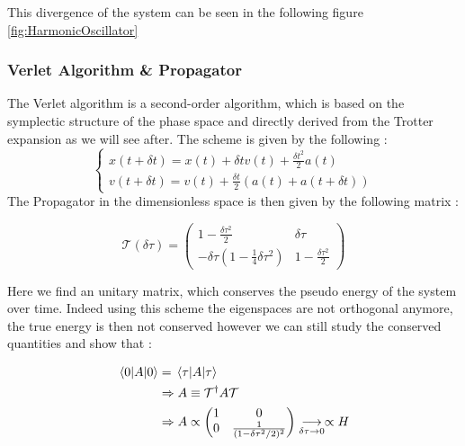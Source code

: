 \documentclass[ansiapaper]{report}
\begin{document}
\begin{multicols}{3}
  This divergence of the system can be seen in the following figure \cref{fig:HarmonicOscillator}

  \subsubsection{Verlet Algorithm \& Propagator}

  The Verlet algorithm is a second-order algorithm, which is based on the symplectic structure of the phase space and directly derived from the Trotter expansion as we will see after. The scheme is given by the following :
  $$
    \begin{cases}
      x(t + \delta t) = x(t) + \delta t v(t) + \frac{\delta t^2}{2} a(t) \\
      v(t + \delta t) = v(t) + \frac{\delta t}{2} (a(t) + a(t + \delta t))
    \end{cases}
  $$
  The Propagator in the dimensionless space is then given by the following matrix :

  $$ \mathcal{T}(\delta \tau) = \begin{pmatrix}
      1 - \frac{\delta \tau^2}{2}                             & \delta \tau                 \\
      -\delta \tau \left(1 - \frac{1}{4} \delta \tau^2\right) & 1 - \frac{\delta \tau^2}{2}
    \end{pmatrix}
  $$

  Here we find an unitary matrix, which conserves the pseudo energy of the system over time. Indeed using this scheme the eigenspaces are not orthogonal anymore, the true energy is then not conserved however we can still study the conserved quantities and show that :

  \begin{align*}
    \expval{A}{0} & = \expval{A}{\tau}
    \\ & \Rightarrow A \equiv \mathcal{T}^\dagger A \mathcal{T}
    \\ & \Rightarrow A \propto \begin{pmatrix}
      1 & 0                                 \\
      0 & \frac{1}{(1 - \delta \tau^2/2)^2}
    \end{pmatrix}\underset{\delta \tau \rightarrow 0}{\longrightarrow} \propto H
  \end{align*}



\end{multicols}
\end{document}
